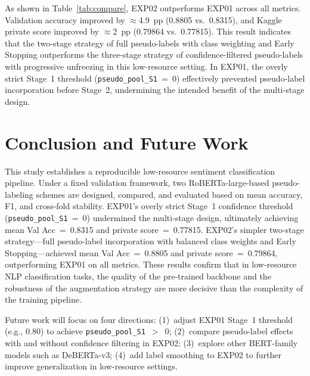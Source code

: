 \documentclass[10pt,twocolumn]{article}
\begin{document}
As shown in Table~\ref{tab:compare}, EXP02 outperforms EXP01 across all
metrics. Validation accuracy improved by $\approx$4.9~pp (0.8805
vs.~0.8315), and Kaggle private score improved by $\approx$2~pp
(0.79864 vs.~0.77815). This result indicates that the two-stage
strategy of full pseudo-labels with class weighting and Early Stopping
outperforms the three-stage strategy of confidence-filtered pseudo-labels
with progressive unfreezing in this low-resource setting. In EXP01, the
overly strict Stage~1 threshold (\texttt{pseudo\_pool\_S1}~=~0)
effectively prevented pseudo-label incorporation before Stage~2,
undermining the intended benefit of the multi-stage design.

\section{Conclusion and Future Work}

This study establishes a reproducible low-resource sentiment
classification pipeline. Under a fixed validation framework, two
RoBERTa-large-based pseudo-labeling schemes are designed, compared, and
evaluated based on mean accuracy, F1, and cross-fold stability. EXP01's
overly strict Stage~1 confidence threshold (\texttt{pseudo\_pool\_S1}~=~0)
undermined the multi-stage design, ultimately achieving mean Val
Acc~=~0.8315 and private score~=~0.77815. EXP02's simpler two-stage
strategy---full pseudo-label incorporation with balanced class weights
and Early Stopping---achieved mean Val Acc~=~0.8805 and private
score~=~0.79864, outperforming EXP01 on all metrics. These results
confirm that in low-resource NLP classification tasks, the quality of
the pre-trained backbone and the robustness of the augmentation strategy
are more decisive than the complexity of the training pipeline.

Future work will focus on four directions: (1)~adjust EXP01 Stage~1
threshold (e.g., 0.80) to achieve \texttt{pseudo\_pool\_S1}~$>$~0;
(2)~compare pseudo-label effects with and without confidence filtering
in EXP02; (3)~explore other BERT-family models such as DeBERTa-v3;
(4)~add label smoothing to EXP02 to further improve generalization in
low-resource settings.

\end{document}
